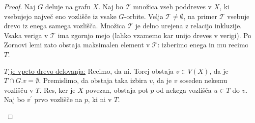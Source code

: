 \documentclass[11pt]{book}
\theoremstyle{definition}
\theoremstyle{zgled}
\theoremstyle{odprtproblem}
\theoremstyle{domacanaloga}
\newenvironment{dokaz}
    {\color{siva}\begin{proof}}
    {\end{proof}}
\theoremstyle{izrek}
\begin{document}
\begin{dokaz}
Naj $G$ deluje na grafu $X$. Naj bo $\mathcal{T}$ množica vseh poddreves v $X$, ki vsebujejo največ eno vozlišče iz vsake $G$-orbite. Velja $\mathcal{T} \neq \emptyset$, na primer $\mathcal{T}$ vsebuje drevo iz enega samega vozlišča. Množica $\mathcal{T}$ je delno urejena z relacijo inkluzije. Vsaka veriga v $\mathcal{T}$ ima zgornjo mejo (lahko vzamemo kar unijo dreves v verigi). Po Zornovi lemi zato obstaja maksimalen element v $\mathcal{T}$: izberimo enega in mu recimo $T$.



\underline{$T$ je vpeto drevo delovanja:} Recimo, da ni. Torej obstaja $v \in V(X)$, da je $T \cap G.v = \emptyset$. Premislimo, da obstaja taka izbira $v$, da je $v$ soseden nekemu vozlišču v $T$. Res, ker je $X$ povezan, obstaja pot $p$ od nekega vozlišča $u \in T$ do $v$. Naj bo $v^\prime$ prvo vozlišče na $p$, ki ni v $T$. 

\begin{figure}[h]
\centering
{}
\end{figure}
\end{dokaz}
\end{document}
